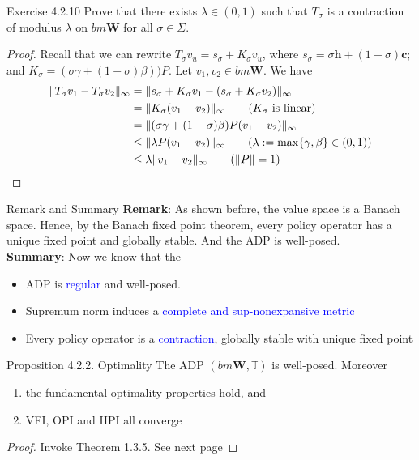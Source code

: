 \documentclass[aspectratio=169]{beamer} %
\begin{document}
\begin{frame}{Exercise 4.2.10}
Prove that there exists $\lambda\in (0,1)$ such that $T_\sigma$ is a contraction of modulus $\lambda$ on $bm\mathbf{W}$ for all $\sigma\in\Sigma$.
\begin{proof}
Recall that we can rewrite $T_\sigma v_u = s_\sigma + K_\sigma v_u$, where $s_\sigma  = \sigma \mathbf{h} + (1-\sigma)\mathbf{c}$; and $K_\sigma  = (\sigma \gamma +(1-\sigma) \beta))P$. 
    Let $v_1,v_2\in bm\mathbf{W}$. We have
    \begin{align*}
        \|T_\sigma v_1-T_\sigma v_2\|_\infty  &=  \|s_\sigma + K_\sigma v_1- (s_\sigma+K_\sigma v_2)\|_\infty\\
        &= \|K_\sigma (v_1-v_2)\|_\infty\tag{$K_\sigma$ is linear}\\
        &= \|(\sigma \gamma +(1-\sigma)\beta)P (v_1-v_2)\|_\infty\\
        &\le \|\lambda P(v_1-v_2)\|_\infty\tag{$\lambda:=\max\{\gamma,\beta\}\in(0,1)$}\\
        &\le \lambda \|v_1-v_2\|_\infty\tag{$\|P\|=1$}
    \end{align*}
\end{proof}
\end{frame}
\begin{frame}{Remark and Summary}
\textbf{Remark}: As shown before, the value space is a Banach space. Hence, by the Banach fixed point theorem, every policy operator has a unique fixed point and globally stable. And the ADP is well-posed.\\
\textbf{Summary}: Now we know that the 
\begin{itemize}
    \item ADP is \textcolor{blue}{regular} and well-posed.
    \item Supremum norm induces a \textcolor{blue}{complete and sup-nonexpansive metric}
    \item Every policy operator is a \textcolor{blue}{contraction}, globally stable with unique fixed point
\end{itemize}
\end{frame}
\begin{frame}{Proposition 4.2.2. Optimality}
        The ADP $(bm\mathbf{W}, \mathbb{T})$ is well-posed. Moreover
        \begin{enumerate}
            \item the fundamental optimality properties hold, and
            \item VFI, OPI and HPI all converge
        \end{enumerate}
    \begin{proof}
        Invoke Theorem 1.3.5. See next page
    \end{proof}
\end{frame}
\end{document}
